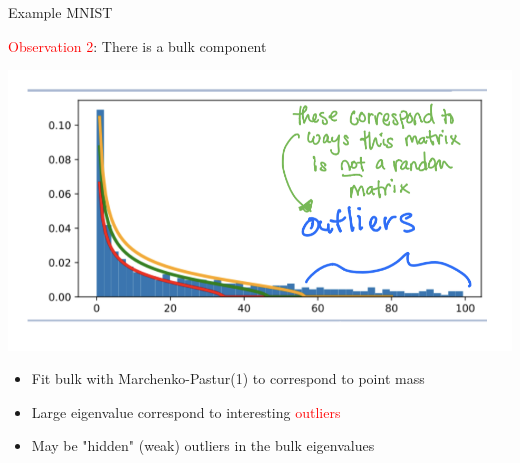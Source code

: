 \documentclass[10pt]{beamer}
\begin{document}
\begin{frame}{Example MNIST}
\begin{center}
    \textcolor{red}{Observation 2}: There is a bulk component 
\end{center}

    \begin{center}
        \includegraphics[scale = 0.45]{part-2-images/MNIST_3_correct.png}
    \end{center}
    \begin{itemize}
        \item Fit bulk with Marchenko-Pastur(1) to correspond to point mass 
        \item Large eigenvalue correspond to interesting \textcolor{red}{outliers}
        \item May be "hidden" (weak) outliers in the bulk eigenvalues
    \end{itemize}
    
\end{frame}

\end{document}
